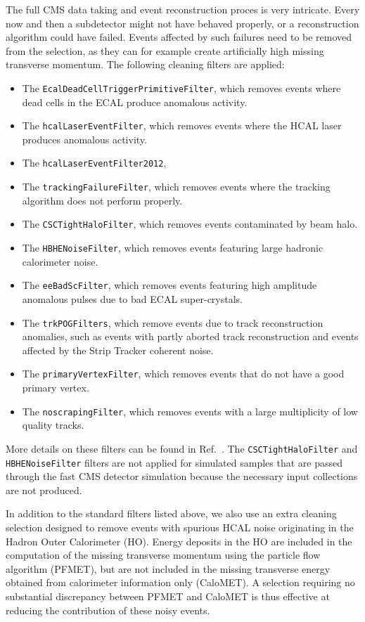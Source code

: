 The full CMS data taking and event reconstruction proces is very intricate. Every now and then a
subdetector might not have behaved properly, or a reconstruction algorithm could have failed. 
Events affected by such failures need to be removed from the selection, as they can for example
create artificially high missing transverse momentum.
The following cleaning filters are applied:

\begin{itemize}
\item The {\tt EcalDeadCellTriggerPrimitiveFilter}, which removes events where dead cells in the
ECAL produce anomalous activity.
\item The {\tt hcalLaserEventFilter}, which removes events where the HCAL laser produces anomalous
activity.
\item The {\tt hcalLaserEventFilter2012}, 
\item The {\tt trackingFailureFilter}, which removes events where the tracking algorithm does not
perform properly.
\item The {\tt CSCTightHaloFilter}, which removes events contaminated by beam halo.
\item The {\tt HBHENoiseFilter}, which removes events featuring large hadronic calorimeter noise.
\item The {\tt eeBadScFilter}, which removes events featuring high amplitude anomalous pulses due
to bad ECAL super-crystals.
\item The {\tt trkPOGFilters}, which remove events due to track reconstruction anomalies, such as
events with partly aborted track reconstruction and events affected by the Strip Tracker coherent
noise.
\item The {\tt primaryVertexFilter}, which removes events that do not have a good primary vertex.
\item The {\tt noscrapingFilter}, which removes events with a large multiplicity of low quality
tracks.
\end{itemize}

More details on these filters can be found in Ref.~\cite{metfilters}. The {\tt CSCTightHaloFilter}
and {\tt HBHENoiseFilter} filters are not applied for simulated samples that are
passed through the fast CMS detector simulation because the necessary input collections are
not produced.

In addition to the standard filters listed above, we also use an extra cleaning selection designed
to remove events with spurious HCAL noise originating in the Hadron Outer Calorimeter (HO). 
Energy deposits in the HO are included in the computation of the missing transverse momentum using 
the particle flow algorithm (PFMET), but are not included in the missing transverse energy obtained
from calorimeter information only (CaloMET). 
A selection requiring no substantial discrepancy between PFMET and CaloMET is thus effective at
reducing the contribution of these noisy events. 

